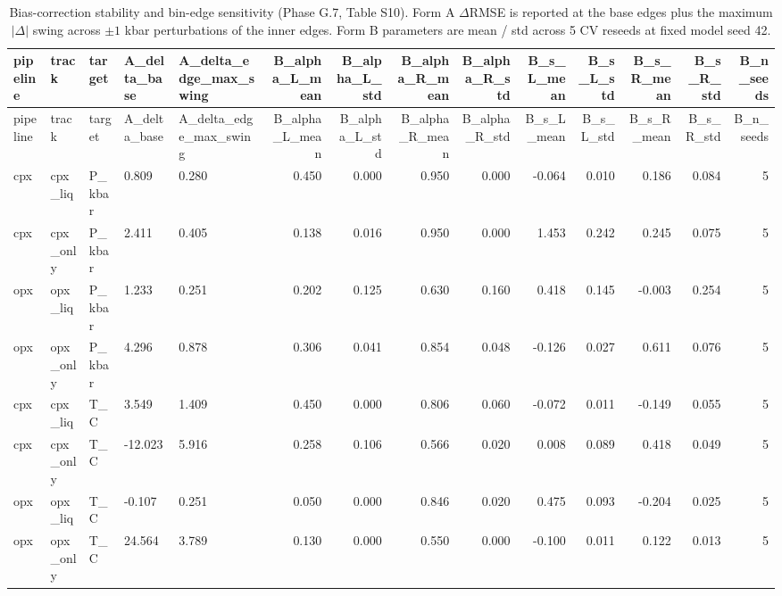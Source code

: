 \begin{longtable}{lllllrrrrrrrrr}
\caption{Bias-correction stability and bin-edge sensitivity (Phase G.7, Table S10). Form A $\Delta$RMSE is reported at the base edges plus the maximum $|\Delta|$ swing across $\pm 1$ kbar perturbations of the inner edges. Form B parameters are mean / std across 5 CV reseeds at fixed model seed 42.} \label{tab:bc_stability} \\
\toprule
pipeline & track & target & A\_delta\_base & A\_delta\_edge\_max\_swing & B\_alpha\_L\_mean & B\_alpha\_L\_std & B\_alpha\_R\_mean & B\_alpha\_R\_std & B\_s\_L\_mean & B\_s\_L\_std & B\_s\_R\_mean & B\_s\_R\_std & B\_n\_seeds \\
\midrule
\endfirsthead
\toprule
pipeline & track & target & A\_delta\_base & A\_delta\_edge\_max\_swing & B\_alpha\_L\_mean & B\_alpha\_L\_std & B\_alpha\_R\_mean & B\_alpha\_R\_std & B\_s\_L\_mean & B\_s\_L\_std & B\_s\_R\_mean & B\_s\_R\_std & B\_n\_seeds \\
\midrule
\endhead
\bottomrule
\endfoot
cpx & cpx\_liq & P\_kbar & 0.809 & 0.280 & 0.450 & 0.000 & 0.950 & 0.000 & -0.064 & 0.010 & 0.186 & 0.084 & 5 \\
cpx & cpx\_only & P\_kbar & 2.411 & 0.405 & 0.138 & 0.016 & 0.950 & 0.000 & 1.453 & 0.242 & 0.245 & 0.075 & 5 \\
opx & opx\_liq & P\_kbar & 1.233 & 0.251 & 0.202 & 0.125 & 0.630 & 0.160 & 0.418 & 0.145 & -0.003 & 0.254 & 5 \\
opx & opx\_only & P\_kbar & 4.296 & 0.878 & 0.306 & 0.041 & 0.854 & 0.048 & -0.126 & 0.027 & 0.611 & 0.076 & 5 \\
cpx & cpx\_liq & T\_C & 3.549 & 1.409 & 0.450 & 0.000 & 0.806 & 0.060 & -0.072 & 0.011 & -0.149 & 0.055 & 5 \\
cpx & cpx\_only & T\_C & -12.023 & 5.916 & 0.258 & 0.106 & 0.566 & 0.020 & 0.008 & 0.089 & 0.418 & 0.049 & 5 \\
opx & opx\_liq & T\_C & -0.107 & 0.251 & 0.050 & 0.000 & 0.846 & 0.020 & 0.475 & 0.093 & -0.204 & 0.025 & 5 \\
opx & opx\_only & T\_C & 24.564 & 3.789 & 0.130 & 0.000 & 0.550 & 0.000 & -0.100 & 0.011 & 0.122 & 0.013 & 5 \\
\end{longtable}
